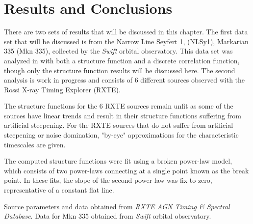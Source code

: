 \documentclass[12pt, oneside]{smuthesis}
\begin{document}
\chapter{\sc Results and Conclusions} \label{resultsConclusions}

There are two sets of results that will be discussed in this chapter. The first data set that will be discussed is from the Narrow Line Seyfert 1, (NLSy1), Markarian 335 (Mkn 335), collected by the \textit{Swift} orbital observatory. This data set was analyzed in \cite{galloblue} with both a structure function and a discrete correlation function, though only the structure function results will be discussed here. The second analysis is work in progress and consists of 6 different sources observed with the Rossi X-ray Timing Explorer (RXTE).

The structure functions for the 6 RXTE sources remain unfit as some of the sources have linear trends and result in their structure functions suffering from artificial steepening. For the RXTE sources that do not suffer from artificial steepening or noise domination, "by-eye" approximations for the characteristic timescales are given.

The computed structure functions were fit using a broken power-law model, which consists of two power-laws connecting at a single point known as the break point. In these fits, the slope of the second power-law was fix to zero, representative of a constant flat line.

\begin{table}
	\centering
	\label{tab:sourcelist}
	\par
	\bigskip
	Source parameters and data obtained from \textit{RXTE AGN Timing \& Spectral Database}. Data for Mkn 335 obtained from \textit{Swift} orbital observatory.
\end{table}
\end{document}
